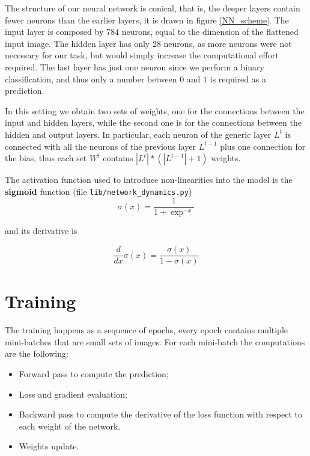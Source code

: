 \documentclass[a4paper,11pt,oneside]{book}
\begin{document}
The structure of our neural network is conical, that is, the deeper layers contain fewer neurons than the earlier layers, it is drawn in figure \ref{NN_scheme}. 
The input layer is composed by $784$ neurons, equal to the dimension of the flattened input image. The hidden layer has only 28 neurons, as more neurons were not necessary for our task, but would simply increase the computational effort required. The last layer has just one neuron since we perform a binary classification, and thus only a number between $0$ and $1$ is required as a prediction.

\bigskip
In this setting we obtain two sets of weights, one for the connections between the input and hidden layers, while the second one is for the connections between the hidden and output layers. In particular, each neuron of the generic layer $L^t$ is connected with all the neurons of the previous layer $L^{t-1}$ plus one connection for the bias, thus each set $W^t$ contains $|L^t| * (|L^{t-1}| + 1)$ weights.

\bigskip
The activation function used to introduce non-linearities into the model is the \textbf{sigmoid} function
(file \texttt{lib/network\_dynamics.py})
\begin{equation}
\sigma(x) = \frac{1}{1 + \exp^{-x}}
\end{equation}

and its derivative is

\begin{equation}
\frac{d}{dx}\sigma(x) = \frac{\sigma(x)}{1 - \sigma(x)}
\end{equation}



\section{Training}
The training happens as a sequence of epochs, every epoch contains multiple mini-batches that are small sets of images. For each mini-batch the computations are the following:

\begin{itemize}
    \item Forward pass to compute the prediction;
    \item Loss and gradient evaluation;
    \item Backward pass to compute the derivative of the loss function with respect to each weight of the network.
    \item Weights update.
\end{itemize}
\end{document}
